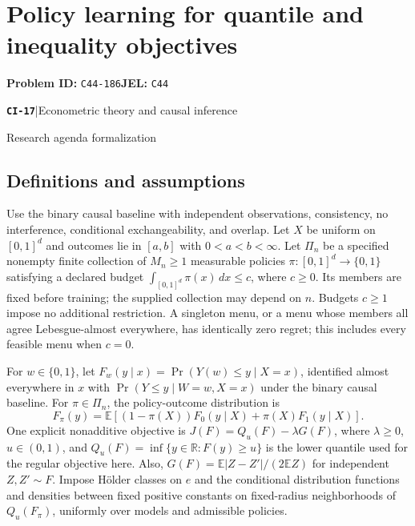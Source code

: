 \documentclass[11pt,a4paper]{article}
\newcommand{\R}{\mathbb R}
\newcommand{\E}{\mathbb E}
\newcommand{\entrymeta}[3]{{\sffamily\small\color{muted}\textbf{\texttt{#1}}\quad|\quad #2\par #3\par}}
\begin{document}
\section*{Policy learning for quantile and inequality objectives}
\textbf{Problem ID:} \texttt{C44-186}\quad \textbf{JEL:} \texttt{C44}\par
\label{problem:OP-0496}
\label{beyond:CI-17}
\entrymeta{CI-17}{Econometric theory and causal inference}{Research agenda formalization}
\subsection*{Definitions and assumptions}
Use the binary causal baseline with independent observations, consistency, no interference, conditional exchangeability, and overlap. Let $X$ be uniform on $[0,1]^d$ and outcomes lie in $[a,b]$ with $0<a<b<\infty$. Let $\Pi_n$ be a specified nonempty finite collection of $M_n\geq1$ measurable policies $\pi:[0,1]^d\to\{0,1\}$ satisfying a declared budget $\int_{[0,1]^d}\pi(x)\,dx\leq c$, where $c\geq0$. Its members are fixed before training; the supplied collection may depend on $n$. Budgets $c\geq1$ impose no additional restriction. A singleton menu, or a menu whose members all agree Lebesgue-almost everywhere, has identically zero regret; this includes every feasible menu when $c=0$.

For $w\in\{0,1\}$, let $F_w(y\mid x)=\Pr(Y(w)\leq y\mid X=x)$, identified almost everywhere in $x$ with $\Pr(Y\leq y\mid W=w,X=x)$ under the binary causal baseline. For $\pi\in\Pi_n$, the policy-outcome distribution is
\[
F_\pi(y)=\E[(1-\pi(X))F_0(y\mid X)+\pi(X)F_1(y\mid X)].
\]
One explicit nonadditive objective is $J(F)=Q_u(F)-\lambda G(F)$, where $\lambda\geq0$, $u\in(0,1)$, and $Q_u(F)=\inf\{y\in\R:F(y)\geq u\}$ is the lower quantile used for the regular objective here. Also,
$G(F)=\E|Z-Z'|/(2\E Z)$ for independent $Z,Z'\sim F$.
Impose Hölder classes on $e$ and the conditional distribution functions and densities between fixed positive constants on fixed-radius neighborhoods of $Q_u(F_\pi)$, uniformly over models and admissible policies.
\end{document}
